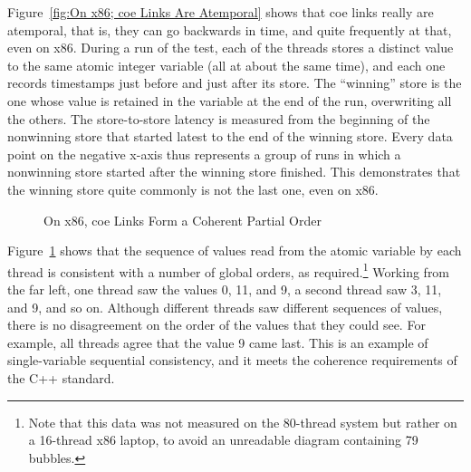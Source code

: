 \documentclass[10]{article}
\begin{document}
Figure~\ref{fig:On x86; coe Links Are Atemporal}
shows that coe links really are atemporal, that is, they can go backwards
in time, and quite frequently at that, even on x86.
During a run of the test, each of the threads stores a distinct value to
the same atomic integer variable (all at about the same time), and each
one records timestamps just before and just after its store.
The ``winning'' store is the one whose value is retained in the
variable at the end of the run, overwriting all the others.
The store-to-store latency is measured from the beginning of the
nonwinning store that started latest to the end of the winning store.
Every data point on the negative x-axis thus represents a group of
runs in which a nonwinning store started after the winning store
finished.
This demonstrates that the winning store quite commonly is not the
last one, even on x86.

\begin{figure}[tb]
\begin{center}
\caption{On x86, coe Links Form a Coherent Partial Order}
\label{fig:On x86, coe Links Form a Coherent Partial Order}
\end{center}
\end{figure}

Figure~\ref{fig:On x86, coe Links Form a Coherent Partial Order} shows
that the sequence of values read from the atomic variable by each
thread is consistent with a number of global orders, as
required.\footnote{
	Note that this data was not measured on the 80-thread system but
	rather on a 16-thread x86 laptop, to avoid an unreadable diagram
	containing 79 bubbles.}
Working from the far left, one thread saw the values 0, 11, and 9,
a second thread saw 3, 11, and 9, and so on.
Although different threads saw different sequences of values, there is no
disagreement on the order of the values that they could see.
For example, all threads agree that the value 9 came last.
This is an example of single-variable sequential consistency, and it
meets the coherence requirements of the C++ standard.
\end{document}

